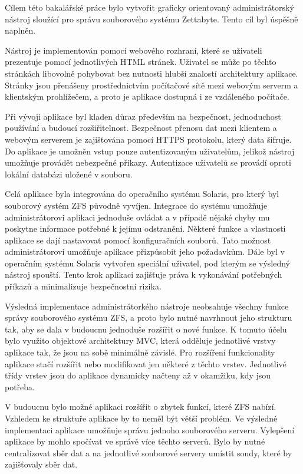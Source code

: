 Cílem této bakalářské práce bylo vytvořit graficky orientovaný administrátorský nástroj sloužící pro správu souborového systému Zettabyte. Tento cíl byl úspěšně naplněn.

Nástroj je implementován pomocí webového rozhraní, které se uživateli prezentuje pomocí jednotlivých HTML stránek. Uživatel se může po těchto stránkách libovolně pohybovat bez nutnosti hlubší znalostí architektury aplikace. Stránky jsou přenášeny prostřednictvím počítačové sítě mezi webovým serverm a klientským prohlížečem, a proto je aplikace dostupná i ze vzdáleného počítače.

Při vývoji aplikace byl kladen důraz především na bezpečnost, jednoduchost používání a budoucí rozšiřitelnost. Bezpečnost přenosu dat mezi klientem a webovým serverem je zajišťována pomocí HTTPS protokolu, který data šifruje. Do aplikace je umožněn vstup pouze autentizovaným uživatelům, jelikož nástroj umožňuje provádět nebezpečné příkazy. Autentizace uživatelů se provádí oproti lokální databázi uložené v souboru.

Celá aplikace byla integrována do operačního systému Solaris, pro který byl souborový systém ZFS původně vyvíjen. Integrace do systému umožňuje administrátorovi aplikaci jednoduše ovládat a v případě nějaké chyby mu poskytne informace potřebné k jejímu odstranění. Některé funkce a vlastnosti aplikace se dají nastavovat pomocí konfiguračních souborů. Tato možnost administrátorovi umožňuje aplikace přizpůsobit jeho požadavkům. Dále byl v operačním systému Solaris vytvořen speciální uživatel, pod kterým se výsledný nástroj spouští. Tento krok aplikaci zajišťuje práva k vykonávání potřebných příkazů a minimalizuje bezpečnostní rizika.

Výsledná implementace administrátorkého nástroje neobsahuje všechny funkce správy souborového systému ZFS, a proto bylo nutné navrhnout jeho strukturu tak, aby se dala v budoucnu jednoduše rozšířit o nové funkce. K tomuto účelu bylo využito objektové architektury MVC, která odděluje jednotlivé vrstvy aplikace tak, že jsou na sobě minimálně závislé. Pro rozšíření funkcionality aplikace stačí rozšířit nebo modifikovat jen některé z těchto vrstev. Jednotlivé třídy vrstev jsou do aplikace dynamicky načteny až v okamžiku, kdy jsou potřeba.

V budoucnu bylo možné aplikaci rozšířit o zbytek funkcí, které ZFS nabízí. Vzhledem ke struktuře aplikace by to neměl být větší problém. Ve výsledné implementaci aplikace umožňuje správu jednoho souborového serveru. Vylepšení aplikace by mohlo spočívat ve správě více těchto serverů. Bylo by nutné centralizovat sběr dat a na jednotlivé souborové servery umístit sondy, které by zajišťovaly sběr dat.  







